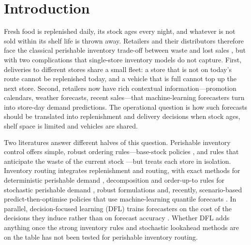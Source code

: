 \section{Introduction}\label{sec:intro}

Fresh food is replenished daily, its stock ages every night, and whatever is not sold within its shelf life is thrown away. Retailers and their distributors therefore face the classical perishable inventory trade-off between waste and lost sales \citep{nahmias1982perishable,bakker2012review}, but with two complications that single-store inventory models do not capture. First, deliveries to different stores share a small fleet: a store that is not on today's route cannot be replenished today, and a vehicle that is full cannot top up the next store. Second, retailers now have rich contextual information---promotion calendars, weather forecasts, recent sales---that machine-learning forecasters turn into store-day demand predictions. The operational question is how such forecasts should be translated into replenishment and delivery decisions when stock ages, shelf space is limited and vehicles are shared.

Two literatures answer different halves of this question. Perishable inventory control offers simple, robust ordering rules---base-stock policies \citep{bu2023asymptotic}, and rules that anticipate the waste of the current stock \citep{broekmeulen2009heuristic,haijema2019improved}---but treats each store in isolation. Inventory routing integrates replenishment and routing, with exact methods for deterministic perishable demand \citep{coelho2014optimal,alvarez2020formulations}, decomposition and order-up-to rules for stochastic perishable demand \citep{crama2018stochastic}, robust formulations \citep{solyali2012robust,he2024robust} and, recently, scenario-based predict-then-optimise policies that use machine-learning quantile forecasts \citep{jia2025scenario}. In parallel, decision-focused learning (DFL) trains forecasters on the cost of the decisions they induce rather than on forecast accuracy \citep{elmachtoub2022smart,mandi2024decision}. Whether DFL adds anything once the strong inventory rules and stochastic lookahead methods are on the table has not been tested for perishable inventory routing.

